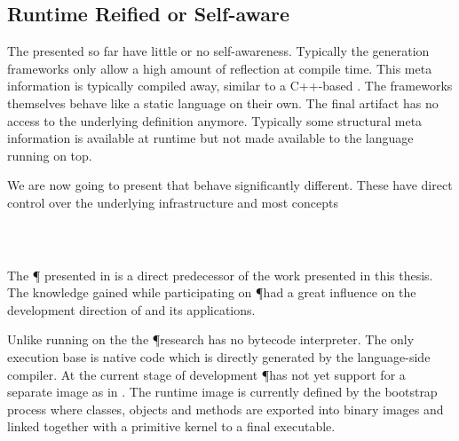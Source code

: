 \subsection{Runtime Reified or Self-aware \VMs}

The \VMs presented so far have little or no self-awareness.
Typically the \VM generation frameworks only allow a high amount of reflection at \VM compile time.
This meta information is typically compiled away, similar to a C++-based \VM.
The \VM frameworks themselves behave like a static language on their own.
The final \VM artifact has no access to the underlying definition anymore.
Typically some structural meta information is available at runtime but not made available to the language running on top.

We are now going to present \VMs that behave significantly different.
These \VMs have direct control over the underlying infrastructure and most concepts
\\
 \\
\\

\subsubsection*{\Pinocchio \VM}

The \P \VM \cite{Verw11a} presented in  is a direct predecessor of the work presented in this thesis.
The knowledge gained while participating on \P had a great influence on the development direction of \B and its applications.

Unlike \PH running on the \Cog \VM the \P research \VM has no bytecode interpreter.
The only execution base is native code which is directly generated by the language-side compiler.
At the current stage of development \P has not yet support for a separate image as in \PH.
The runtime image is currently defined by the bootstrap process where classes, objects and methods are exported into binary images and linked together with a primitive kernel to a final executable.

